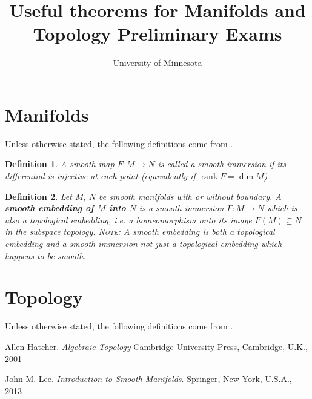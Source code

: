 \documentclass{article}
\title{Useful theorems for Manifolds and Topology Preliminary Exams}
\author{University of Minnesota}
\newtheorem*{definition}{Definition}
\DeclareMathOperator{\rk}{rank}
\begin{document}
\maketitle


\section{Manifolds}
	Unless otherwise stated, the following definitions come from \cite{lee-ism}.
	
	\begin{definition}
		A smooth map $F: M \rightarrow N$ is called a smooth immersion if its differential is injective at each point (equivalently if $\rk F= \dim M$)
	\end{definition}
	
	\begin{definition}
		Let $M$, $N$ be smooth manifolds with or without boundary. 
		A \textbf{smooth embedding of $M$ into $N$} is a smooth immersion $F:M \rightarrow N$ which is also a topological embedding, i.e. a homeomorphism onto its image $F(M)\subseteq N$ in the subspace topology.
		\textsc{Note:} A smooth embedding is both a topological embedding and a smooth immersion not just a topological embedding which happens to be smooth.
	\end{definition}
	


\section{Topology}
	Unless otherwise stated, the following definitions come from \cite{hatcher-at}.
	


\begin{thebibliography}{9}

Allen Hatcher.
\textit{Algebraic Topology}
Cambridge University Press, Cambridge, U.K., 2001

John M. Lee. 
\textit{Introduction to Smooth Manifolds}. 
Springer, New York, U.S.A., 2013

\end{thebibliography}
\end{document}
